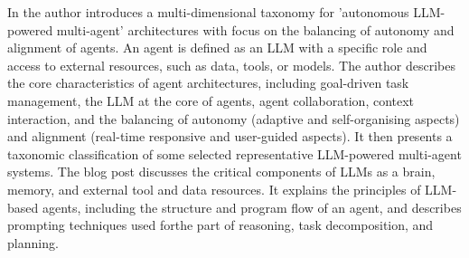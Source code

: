 \documentclass{article}
\begin{document}
In \cite{handler_taxonomy_2023} the author introduces a multi-dimensional taxonomy for 'autonomous LLM-powered multi-agent' architectures with focus on the balancing of autonomy and alignment of agents. An agent is defined as an LLM with a specific role and access to external resources, such as data, tools, or models. The author describes the core characteristics of agent architectures, including goal-driven task management, the LLM at the core of agents, agent collaboration, context interaction, and the balancing of autonomy (adaptive and self-organising aspects) and alignment (real-time responsive and user-guided aspects). It then presents a taxonomic classification of some selected representative LLM-powered multi-agent systems. 
The blog post \cite{yule_wang_complete_2023} discusses the critical components of LLMs as a brain, memory, and external tool and data resources. It explains the principles of LLM-based agents, including the structure and program flow of an agent, and describes prompting techniques used forthe part of reasoning, task decomposition, and planning. 
\end{document}
